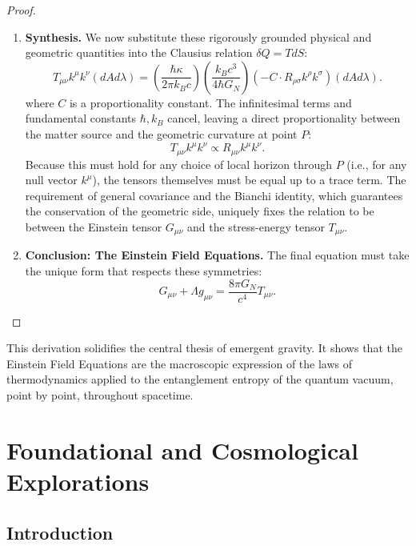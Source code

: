 \documentclass[11pt, letterpaper]{report}
\theoremstyle{plain} %
\theoremstyle{definition} %
\theoremstyle{remark} %
\begin{document}
\begin{proof}
\begin{enumerate}
    \item \textbf{Synthesis.} We now substitute these rigorously grounded physical and geometric quantities into the Clausius relation $\delta Q = T dS$:
    $$
    T_{\mu\nu}k^\mu k^\nu (dA d\lambda) = \left(\frac{\hbar \kappa}{2\pi k_B c}\right) \left( \frac{k_B c^3}{4\hbar G_N} \right) \left( -C \cdot R_{\rho\sigma}k^\rho k^\sigma \right) (dA d\lambda).
    $$
    where $C$ is a proportionality constant. The infinitesimal terms and fundamental constants $\hbar, k_B$ cancel, leaving a direct proportionality between the matter source and the geometric curvature at point $P$:
    \begin{equation}
        T_{\mu\nu}k^\mu k^\nu \propto R_{\mu\nu}k^\mu k^\nu.
    \end{equation}
    Because this must hold for any choice of local horizon through $P$ (i.e., for any null vector $k^\mu$), the tensors themselves must be equal up to a trace term. The requirement of general covariance and the Bianchi identity, which guarantees the conservation of the geometric side, uniquely fixes the relation to be between the Einstein tensor $G_{\mu\nu}$ and the stress-energy tensor $T_{\mu\nu}$.

    \item \textbf{Conclusion: The Einstein Field Equations.} The final equation must take the unique form that respects these symmetries:
    \begin{equation}
        G_{\mu\nu} + \Lambda g_{\mu\nu} = \frac{8\pi G_N}{c^4} T_{\mu\nu}.
    \end{equation}
\end{enumerate}
\end{proof}
This derivation solidifies the central thesis of emergent gravity. It shows that the Einstein Field Equations are the macroscopic expression of the laws of thermodynamics applied to the entanglement entropy of the quantum vacuum, point by point, throughout spacetime.









\chapter{Foundational and Cosmological Explorations}
\label{chap:explorations}

\section{Introduction}
\end{document}
